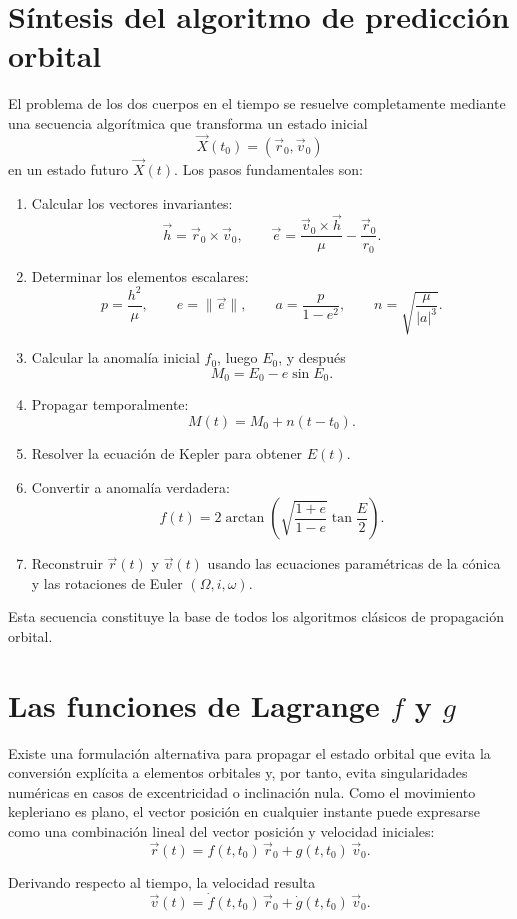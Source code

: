\section{Síntesis del algoritmo de predicción orbital}
El problema de los dos cuerpos en el tiempo se resuelve completamente mediante una secuencia algorítmica que transforma un estado inicial
\[
\vec{X}(t_0) = (\vec{r}_0,\vec{v}_0)
\]
en un estado futuro \(\vec{X}(t)\). Los pasos fundamentales son:
\begin{enumerate}
    \item Calcular los vectores invariantes:
\[
\vec{h} = \vec{r}_0 \times \vec{v}_0,
\qquad
\vec{e} = \frac{\vec{v}_0 \times \vec{h}}{\mu} - \frac{\vec{r}_0}{r_0}.
\]
    \item Determinar los elementos escalares:
\[
 p = \frac{h^2}{\mu}, \qquad e = \|\vec{e}\|, \qquad a = \frac{p}{1-e^2}, \qquad n = \sqrt{\frac{\mu}{|a|^3}}.
\]
    \item Calcular la anomalía inicial \(f_0\), luego \(E_0\), y después
\[
 M_0 = E_0 - e\sin E_0.
\]
    \item Propagar temporalmente:
\[
 M(t) = M_0 + n(t-t_0).
\]
    \item Resolver la ecuación de Kepler para obtener \(E(t)\).
    \item Convertir a anomalía verdadera:
\[
 f(t) = 2\arctan\left(\sqrt{\frac{1+e}{1-e}}\tan\frac{E}{2}\right).
\]
    \item Reconstruir \(\vec{r}(t)\) y \(\vec{v}(t)\) usando las ecuaciones paramétricas de la cónica y las rotaciones de Euler \((\Omega,i,\omega)\).
\end{enumerate}

Esta secuencia constituye la base de todos los algoritmos clásicos de propagación orbital.

\section{Las funciones de Lagrange \texorpdfstring{$f$}{f} y \texorpdfstring{$g$}{g}}
Existe una formulación alternativa para propagar el estado orbital que evita la conversión explícita a elementos orbitales y, por tanto, evita singularidades numéricas en casos de excentricidad o inclinación nula. Como el movimiento kepleriano es plano, el vector posición en cualquier instante puede expresarse como una combinación lineal del vector posición y velocidad iniciales:
\[
 \vec{r}(t) = f(t,t_0)\,\vec{r}_0 + g(t,t_0)\,\vec{v}_0.
\]

Derivando respecto al tiempo, la velocidad resulta
\[
 \vec{v}(t) = \dot{f}(t,t_0)\,\vec{r}_0 + \dot{g}(t,t_0)\,\vec{v}_0.
\]

